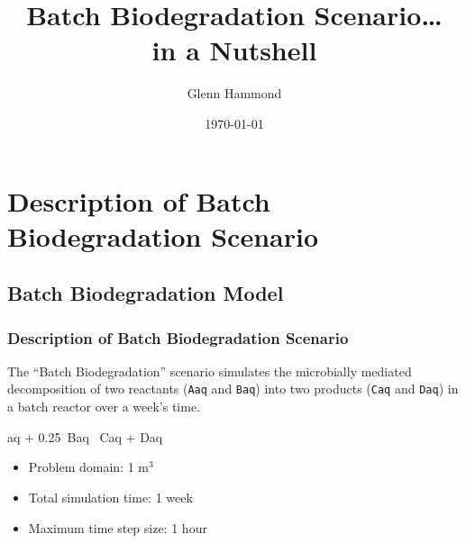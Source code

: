 \documentclass{beamer}
\def\EQ#1\EN{\begin{equation*}#1\end{equation*}}
\begin{document}
\title{Batch Biodegradation Scenario\ldots\\in a Nutshell}
\author{Glenn Hammond}
\date{\today}

\frame{\titlepage}


\section{Description of Batch Biodegradation Scenario}

\subsection{Batch Biodegradation Model}

\begin{frame}\frametitle{Description of Batch Biodegradation Scenario}

The ``Batch Biodegradation'' scenario simulates the microbially mediated decomposition of two reactants (\verb|Aaq| and \verb|Baq|) into two products (\verb|Caq| and \verb|Daq|) in a batch reactor over a week's time.

\EQ
Aaq + 0.25\, Baq \, Caq + Daq
\EN

\begin{itemize}
  \item Problem domain: 1 m$^3$
  \item Total simulation time: 1 week
  \item Maximum time step size: 1 hour
\end{itemize}

\end{frame}

\end{document}
